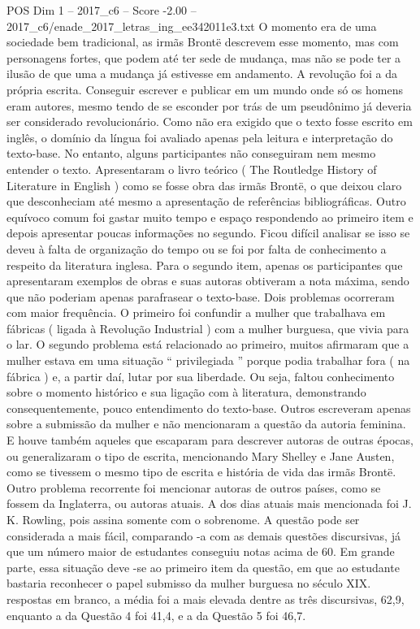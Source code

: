 \begin{textsample}{POS Dim 1 – 2017\_c6 – Score -2.00 – 2017\_c6/enade\_2017\_letras\_ing\_ee342011e3.txt}
O momento era de uma sociedade bem tradicional, as irmãs Brontë descrevem esse momento, mas com personagens fortes, que podem até ter sede de mudança, mas não se pode ter a ilusão de que uma a mudança já estivesse em andamento.
A revolução foi a da própria escrita.
Conseguir escrever e publicar em um mundo onde só os homens eram autores, mesmo tendo de se esconder por trás de um pseudônimo já deveria ser considerado revolucionário.
Como não era exigido que o texto fosse escrito em inglês, o domínio da língua foi avaliado apenas pela leitura e interpretação do texto-base.
No entanto, alguns participantes não conseguiram nem mesmo entender o texto.
Apresentaram o livro teórico ( The Routledge History of Literature in English ) como se fosse obra das irmãs Brontë, o que deixou claro que desconheciam até mesmo a apresentação de referências bibliográficas.
Outro equívoco comum foi gastar muito tempo e espaço respondendo ao primeiro item e depois apresentar poucas informações no segundo.
Ficou difícil analisar se isso se deveu à falta de organização do tempo ou se foi por falta de conhecimento a respeito da literatura inglesa.
Para o segundo item, apenas os participantes que apresentaram exemplos de obras e suas autoras obtiveram a nota máxima, sendo que não poderiam apenas parafrasear o texto-base.
Dois problemas ocorreram com maior frequência.
O primeiro foi confundir a mulher que trabalhava em fábricas ( ligada à Revolução Industrial ) com a mulher burguesa, que vivia para o lar.
O segundo problema está relacionado ao primeiro, muitos afirmaram que a mulher estava em uma situação “ privilegiada ” porque podia trabalhar fora ( na fábrica ) e, a partir daí, lutar por sua liberdade.
Ou seja, faltou conhecimento sobre o momento histórico e sua ligação com à literatura, demonstrando consequentemente, pouco entendimento do texto-base.
Outros escreveram apenas sobre a submissão da mulher e não mencionaram a questão da autoria feminina.
E houve também aqueles que escaparam para descrever autoras de outras épocas, ou generalizaram o tipo de escrita, mencionando Mary Shelley e Jane Austen, como se tivessem o mesmo tipo de escrita e história de vida das irmãs Brontë.
Outro problema recorrente foi mencionar autoras de outros países, como se fossem da Inglaterra, ou autoras atuais.
A dos dias atuais mais mencionada foi J.
K.
Rowling, pois assina somente com o sobrenome.
A questão pode ser considerada a mais fácil, comparando -a com as demais questões discursivas, já que um número maior de estudantes conseguiu notas acima de 60.
Em grande parte, essa situação deve -se ao primeiro item da questão, em que ao estudante bastaria reconhecer o papel submisso da mulher burguesa no século XIX. respostas em branco, a média foi a mais elevada dentre as três discursivas, 62,9, enquanto a da Questão 4 foi 41,4, e a da Questão 5 foi 46,7.

\end{textsample}
